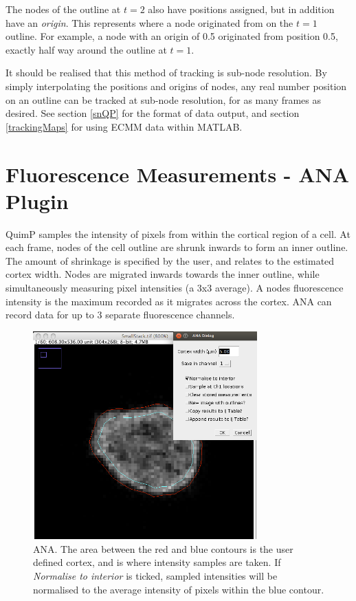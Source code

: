 \documentclass[a4paper,12pt]{article}
\begin{document}
The nodes of the outline at $t=2$ also have positions assigned, but in addition have an \textit{origin}.  This represents 
where a node originated from on the $t=1$ outline.  For example, a node with an origin of 0.5 originated from 
position 0.5, exactly half way around the outline at $t=1$.

It should be realised that this method of tracking is sub-node resolution.  By simply interpolating the positions and origins of 
nodes, any real number position on an outline can be tracked at sub-node resolution, for as many frames as desired.  See section
\ref{snQP} for the format of data output, and section \ref{trackingMaps} for using ECMM data within MATLAB.


\section{Fluorescence Measurements - ANA Plugin}
\label{ana}

QuimP samples the intensity of pixels from within the cortical region of a cell.  At each frame, nodes of the cell outline
are shrunk inwards to form an inner outline.  The amount of shrinkage is specified by the user, and relates to the
estimated cortex width.  Nodes are 
migrated inwards towards the inner outline, while simultaneously measuring pixel intensities  (a 3x3 average).  
A nodes fluorescence intensity is the maximum recorded as it migrates across the cortex.  ANA can record data for up to 3 separate 
fluorescence channels.

\begin{figure}[ht]
   \centering
   \includegraphics[height=8cm]{ana.png} %
   \caption{ANA.  The area between the red and blue contours is the user defined cortex, and is where
   intensity samples are taken. If \emph{Normalise to interior} is ticked, sampled intensities will be normalised
   to the average intensity of pixels within the blue contour.}
   \label{fig:ana}
\end{figure}
\end{document}

